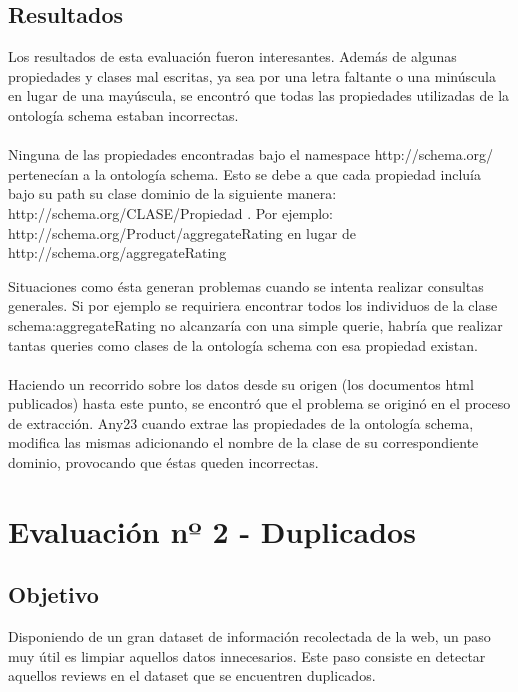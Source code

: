 \subsection*{Resultados}
Los resultados de esta evaluación fueron interesantes. Además de algunas propiedades y clases mal escritas, ya sea por una letra faltante o una minúscula en lugar 
de una mayúscula, se encontró que todas las propiedades utilizadas de la ontología schema estaban incorrectas.
\\\\
Ninguna de las propiedades encontradas bajo el namespace http://schema.org/ pertenecían a la ontología schema.
Esto se debe a que cada propiedad incluía bajo su path su clase dominio de la siguiente manera: \\\noindent http://schema.org/CLASE/Propiedad .
Por ejemplo: \\\noindent
http://schema.org/Product/aggregateRating en lugar de \\\noindent http://schema.org/aggregateRating

Situaciones como ésta generan problemas cuando se intenta realizar consultas generales. Si por ejemplo se requiriera encontrar todos los individuos de la clase schema:aggregateRating no alcanzaría con 
una simple querie, habría que realizar tantas queries como clases de la ontología schema con esa propiedad existan.
\\\\
Haciendo un recorrido sobre los datos desde su origen (los documentos html publicados) hasta este punto, se encontró que el problema se 
originó en el proceso de extracción. 
Any23 cuando extrae las propiedades de la ontología schema, modifica las mismas adicionando el nombre de la clase de su correspondiente dominio, provocando que éstas queden incorrectas.

\section{Evaluación nº 2 - Duplicados}
\label{section:evaluacion-duplicados}

\subsection*{Objetivo}
Disponiendo de un gran dataset de información recolectada de la web, un paso muy útil es limpiar aquellos datos innecesarios. 
Este paso consiste en detectar aquellos reviews en el dataset que se encuentren duplicados.

